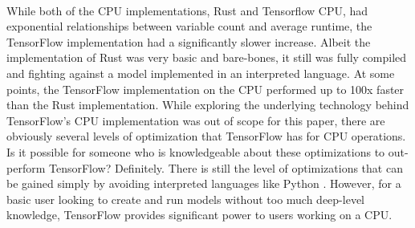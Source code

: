 \documentclass[12pt]{article}
\begin{document}
\paragraph{} %
While both of the CPU implementations, Rust and Tensorflow CPU, had exponential relationships between variable count and average runtime, the TensorFlow implementation had a significantly slower increase.
Albeit the implementation of Rust was very basic and bare-bones, it still was fully compiled and fighting against a model implemented in an interpreted language.
At some points, the TensorFlow implementation on the CPU performed up to 100x faster than the Rust implementation.
While exploring the underlying technology behind TensorFlow's CPU implementation was out of scope for this paper, there are obviously several levels of optimization that TensorFlow has for CPU operations.
Is it possible for someone who is knowledgeable about these optimizations to out-perform TensorFlow? Definitely.
There is still the level of optimizations that can be gained simply by avoiding interpreted languages like Python \cite{article_compiled_interpreted_hybrid_languages}.
However, for a basic user looking to create and run models without too much deep-level knowledge, TensorFlow provides significant power to users working on a CPU.
\end{document}
